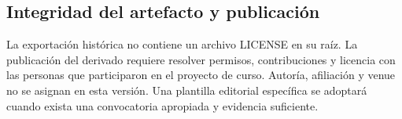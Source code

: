 \subsection{Integridad del artefacto y publicación}
La exportación histórica no contiene un archivo LICENSE en su raíz. La
publicación del derivado requiere resolver permisos, contribuciones y licencia
con las personas que participaron en el proyecto de curso. Autoría, afiliación
y venue no se asignan en esta versión. Una plantilla editorial específica
se adoptará cuando exista una convocatoria apropiada y evidencia suficiente.
